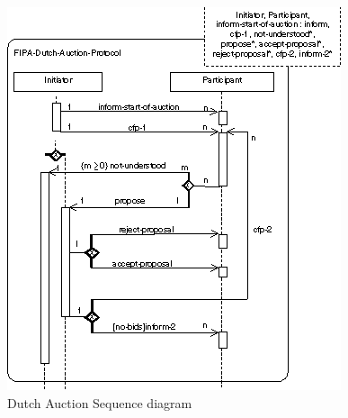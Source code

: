 \documentclass[a4paper, 11pt]{article}
\begin{document}
\begin{figure}[H]
	\caption{Dutch Auction Sequence diagram}
	\centering
	\includegraphics[scale=0.9]{./images/sequence-dutchauction.png}
\end{figure}
\end{document}
